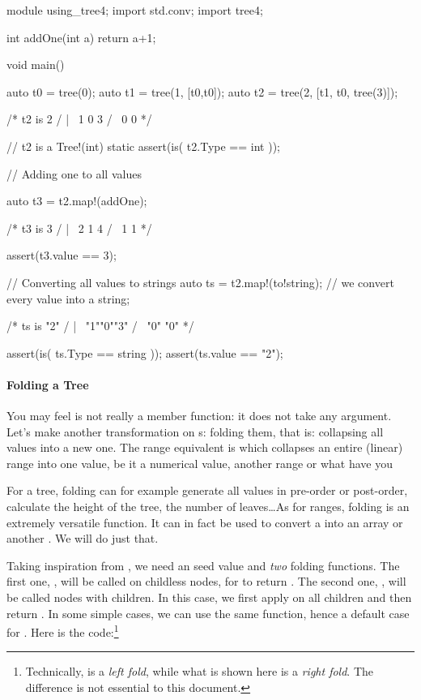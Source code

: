 \begin{dcode}
module using_tree4;
import std.conv;
import tree4;

int addOne(int a) { return a+1;}

void main()
{
    auto t0 = tree(0);
    auto t1 = tree(1, [t0,t0]);
    auto t2 = tree(2, [t1, t0, tree(3)]);

/* t2 is       2
             / | \
            1  0  3
           / \
          0   0
*/

    // t2 is a Tree!(int)
    static assert(is( t2.Type == int ));

    // Adding one to all values
    
    auto t3 = t2.map!(addOne);
    
/* t3 is       3
             / | \
            2  1  4
           / \
          1   1
*/

    assert(t3.value == 3);

    // Converting all values to strings
    auto ts = t2.map!(to!string); // we convert every value into a string;
    
/* ts is      "2"
             / | \
           "1""0""3"
           / \
         "0"  "0"
*/

    assert(is( ts.Type == string ));
    assert(ts.value == "2");
}
\end{dcode}

\paragraph{Folding a Tree} You may feel  is not really a member function: it does not take any argument. Let's make another transformation on s: folding them, that is: collapsing all values into a new one. The range equivalent is  which collapses an entire (linear) range into one value, be it a numerical value, another range or what have you

For a tree, folding can for example generate all values in pre-order or post-order, calculate the height of the tree, the number of leaves\ldots As for ranges, folding is an extremely versatile function. It can in fact be used to convert a  into an array or another . We will do just that.

Taking inspiration from , we need an seed value and \emph{two} folding functions. The first one, , will be called on childless nodes, for  to return . The second one, , will be called nodes with children. In this case, we first apply  on all children and then return . In some simple cases, we can use the same function, hence a default case for . Here is the code:\footnote{ Technically,  is a \emph{left fold}, while what is shown here is a \emph{right fold}. The difference is not essential to this document.} 

